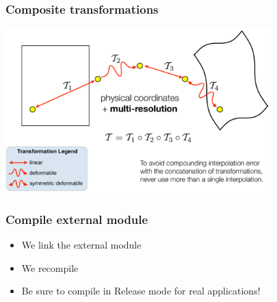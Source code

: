 

\begin{frame}
\frametitle{Composite transformations}
\includegraphics[height=2.5in]{../Art/composite}
\end{frame}


\begin{frame}
\frametitle{Compile external module}
\begin{itemize}
\item We link the external module
\item We recompile
\item Be sure to compile in Release mode for real applications!
\end{itemize}
\end{frame}


